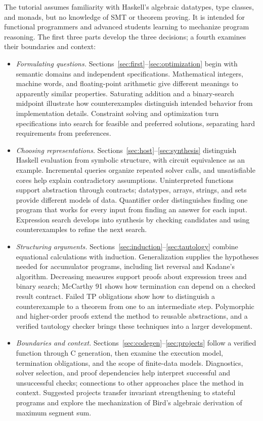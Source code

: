 \documentclass[review]{jfp-epi}
\begin{document}
The tutorial assumes familiarity with Haskell's algebraic datatypes, type
classes, and monads, but no knowledge of SMT or theorem proving. It is intended
for functional programmers and advanced students learning to mechanize program
reasoning. The first three parts develop the three decisions; a fourth examines
their boundaries and context:
\begin{itemize}
\item \emph{Formulating questions.}
  Sections~\ref{sec:first}--\ref{sec:optimization} begin with semantic domains
  and independent specifications. Mathematical integers, machine words, and
  floating-point arithmetic give different meanings to apparently similar
  properties. Saturating addition and a binary-search midpoint illustrate how
  counterexamples distinguish intended behavior from implementation details.
  Constraint solving and optimization turn specifications into search for
  feasible and preferred solutions, separating hard requirements from preferences.
\item \emph{Choosing representations.}
  Sections~\ref{sec:host}--\ref{sec:synthesis} distinguish Haskell evaluation
  from symbolic structure, with circuit equivalence as an example. Incremental
  queries organize repeated solver calls, and unsatisfiable cores help explain
  contradictory assumptions. Uninterpreted functions support abstraction through
  contracts; datatypes, arrays, strings, and sets provide different models of data.
  Quantifier order distinguishes finding one program that works for every input
  from finding an answer for each input. Expression search develops into synthesis
  by checking candidates and using counterexamples to refine the next search.
\item \emph{Structuring arguments.}
  Sections~\ref{sec:induction}--\ref{sec:tautology} combine equational calculations
  with induction. Generalization supplies the hypotheses needed for accumulator
  programs, including list reversal and Kadane's algorithm. Decreasing measures
  support proofs about expression trees and binary search; McCarthy 91 shows how
  termination can depend on a checked result contract. Failed TP obligations
  show how to distinguish a counterexample to a theorem from one to an intermediate
  step. Polymorphic and higher-order proofs extend the method to reusable
  abstractions, and a verified tautology checker brings these techniques into a
  larger development.
\item \emph{Boundaries and context.}
  Sections~\ref{sec:codegen}--\ref{sec:projects} follow a verified function through
  C generation, then examine the execution model, termination obligations, and
  the scope of finite-data models. Diagnostics, solver selection, and proof
  dependencies help interpret successful and unsuccessful checks; connections
  to other approaches place the method in context. Suggested projects transfer
  invariant strengthening to stateful programs and explore the mechanization of
  Bird's algebraic derivation of maximum segment sum.
\end{itemize}
\end{document}
